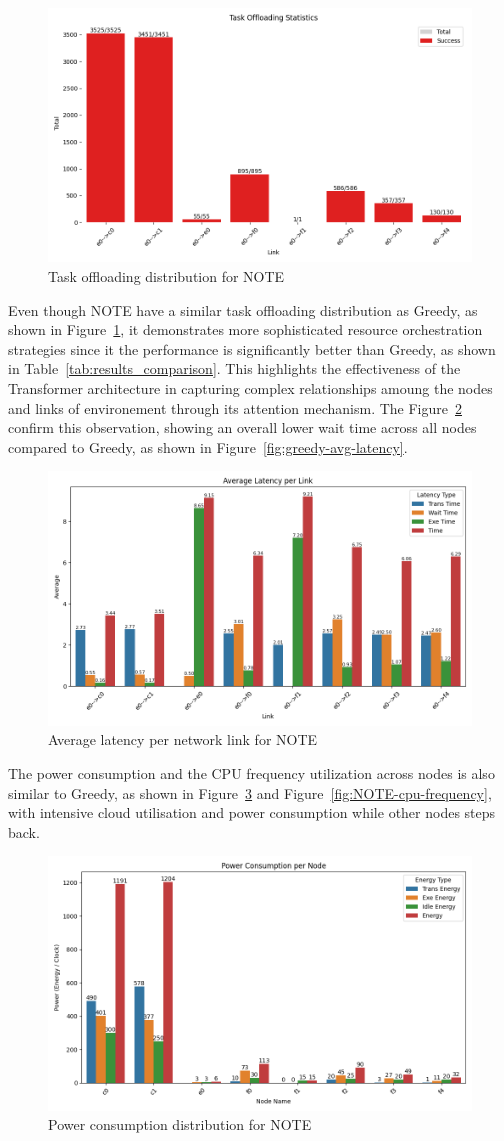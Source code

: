 \documentclass[preprint,3p,authoryear]{elsarticle}
\begin{document}
\begin{figure}[H]
    \centering
    \includegraphics[width=0.5\linewidth]{figs/NOTE/task_offloading_statistics.png}
    \caption{Task offloading distribution for NOTE}
    \label{fig:NOTE-offloading-stats}
\end{figure}

Even though NOTE have a similar task offloading distribution as Greedy, as shown in Figure~\ref{fig:NOTE-offloading-stats}, it demonstrates more sophisticated resource orchestration strategies since it the performance is significantly better than Greedy, as shown in Table~\ref{tab:results_comparison}. This highlights the effectiveness of the Transformer architecture in capturing complex relationships amoung the nodes and links of environement through its attention mechanism. The Figure~\ref{fig:NOTE-avg-latency} confirm this observation, showing an overall lower wait time across all nodes compared to Greedy, as shown in Figure~\ref{fig:greedy-avg-latency}.

\begin{figure}[H]
    \centering
    \includegraphics[width=0.5\linewidth]{figs/NOTE/avg_latency_per_link.png}
    \caption{Average latency per network link for NOTE}
    \label{fig:NOTE-avg-latency}
\end{figure}

The power consumption and the CPU frequency utilization across nodes is also similar to Greedy, as shown in Figure~\ref{fig:NOTE-energy-consumption} and Figure~\ref{fig:NOTE-cpu-frequency}, with intensive cloud utilisation and power consumption while other nodes steps back.

\begin{figure}[H]
    \centering
    \includegraphics[width=0.5\linewidth]{figs/NOTE/power_consumption_per_node.png}
    \caption{Power consumption distribution for NOTE}
    \label{fig:NOTE-energy-consumption}
\end{figure}
\end{document}
